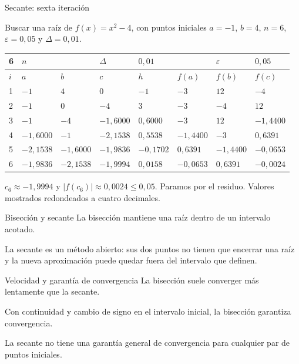 \documentclass[original_version/main.tex]{subfiles}
\begin{document}
\begin{frame}[t]{Secante: sexta iteración}
\begin{minipage}[t][13mm][t]{\textwidth}\small Buscar una raíz de $f(x)=x^2-4$, con puntos iniciales $a=-1$, $b=4$, $n=6$, $\varepsilon=0{,}05$ y $\Delta=0{,}01$.\end{minipage}\par{\scriptsize\setlength{\tabcolsep}{2pt}\renewcommand{\arraystretch}{1}\begin{center}\begin{tabular}{|C{.04\textwidth}|C{.112\textwidth}|C{.112\textwidth}|C{.112\textwidth}|C{.112\textwidth}|C{.112\textwidth}|C{.112\textwidth}|C{.112\textwidth}|}
\hline
\rule{0pt}{4.3mm}6 & $n$ &  &  $\Delta$  & $0{,}01$ &  & $\varepsilon$ & $0{,}05$\\\hline
\rule{0pt}{4.3mm}$i$ & $a$ & $b$ & $c$ & $h$ & $f(a)$ & $f(b)$ & $f(c)$\\\hline
\rule{0pt}{4.3mm}1 & $-1$ & $4$ & $0$ & $-1$ & $-3$ & $12$ & $-4$\\\hline
\rule{0pt}{4.3mm}2 & $-1$ & $0$ & $-4$ & $3$ & $-3$ & $-4$ & $12$\\\hline
\rule{0pt}{4.3mm}3 & $-1$ & $-4$ & $-1{,}6000$ & $0{,}6000$ & $-3$ & $12$ & $-1{,}4400$\\\hline
\rule{0pt}{4.3mm}4 & $-1{,}6000$ & $-1$ & $-2{,}1538$ & $0{,}5538$ & $-1{,}4400$ & $-3$ & $0{,}6391$\\\hline
\rule{0pt}{4.3mm}5 & $-2{,}1538$ & $-1{,}6000$ & $-1{,}9836$ & $-0{,}1702$ & $0{,}6391$ & $-1{,}4400$ & $-0{,}0653$\\\hline
\rule{0pt}{4.3mm}6 & $-1{,}9836$ & $-2{,}1538$ & $-1{,}9994$ & $0{,}0158$ & $-0{,}0653$ & $0{,}6391$ & $-0{,}0024$\\\hline
\end{tabular}\end{center}}\begin{minipage}[t][10mm][t]{\textwidth}\footnotesize $c_6\approx-1{,}9994$ y $|f(c_6)|\approx0{,}0024\le0{,}05$. Paramos por el residuo. Valores mostrados redondeados a cuatro decimales.\end{minipage}
\end{frame}

\begin{frame}{Bisección y secante}
La bisección mantiene una raíz dentro de un intervalo acotado.\par\medskip La secante es un método abierto: sus dos puntos no tienen que encerrar una raíz y la nueva aproximación puede quedar fuera del intervalo que definen.
\end{frame}

\begin{frame}{Velocidad y garantía de convergencia}
La bisección suele converger más lentamente que la secante.\par\medskip Con continuidad y cambio de signo en el intervalo inicial, la bisección garantiza convergencia.\par\medskip La secante no tiene una garantía general de convergencia para cualquier par de puntos iniciales.
\end{frame}
\end{document}
